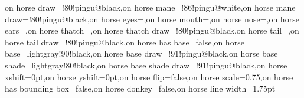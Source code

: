 {}{on horse draw=\pingu@color@horseon!80!pingu@black,on horse mane=\pingu@color@horseon!86!pingu@white,on horse mane draw=\pingu@color@horseon@mane!80!pingu@black,on horse eyes=\pingu@color@horseon@draw,on horse mouth=\pingu@color@horseon@draw,on horse nose=\pingu@color@horseon@draw,on horse ears=\pingu@color@horseon,on horse thatch=\pingu@color@horseon@mane,on horse thatch draw=\pingu@color@horseon@thatch!80!pingu@black,on horse tail=\pingu@color@horseon@mane,on horse tail draw=\pingu@color@horseon@tail!80!pingu@black,on horse has base=false,on horse base=lightgray!90!black,on horse base draw=\pingu@color@horseon@base!91!pingu@black,on horse base shade=lightgray!80!black,on horse base shade draw=\pingu@color@horseon@base@shade!91!pingu@black,on horse xshift=0pt,on horse yshift=0pt,on horse flip=false,on horse scale=0.75,on horse has bounding box=false,on horse donkey=false,on horse line width=1.75pt}


\def\pingu@draw@eb@horseon{%
\pingu@layer{background}[scale=\pingu@x@horseon@scale,every path/.append style={line cap=round, line join=round},shift=(\pingu@name-bottom-center)]
\if@pingu@x@horse@on@donkey@
    \@pingu@@horse@@donkey@true
\fi
\if@pingu@x@horse@on@flip@
 \scope[xshift=-45mm-\pingu@x@horseon@xshift,yshift=-67mm+\pingu@x@horseon@yshift,xscale=\if@pingu@x@horse@on@donkey@ 1.1\else1\fi,yscale=\if@pingu@@horse@@donkey@.9\else1\fi]
 \else
 \scope[xshift=45mm+\pingu@x@horseon@xshift,yshift=-67mm+\pingu@x@horseon@yshift,xscale=\if@pingu@x@horse@on@donkey@-1.1\else-1\fi,yscale=\if@pingu@@horse@@donkey@.9\else1\fi]
 \fi
\edef\@pingu@@horse@lw{\pingu@horseon@x@line@width}
\if@pingu@x@horse@on@boundingbox@\else\pgfinterruptboundingbox\fi
    \pingu@@drawer@horse{on}
\if@pingu@x@horse@on@boundingbox@\else\endpgfinterruptboundingbox\fi
\endscope\endpingu@layer
}